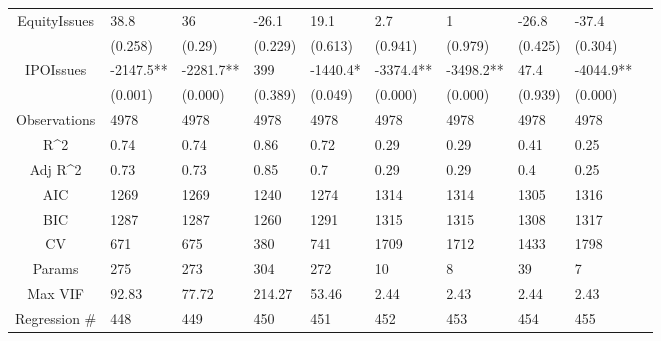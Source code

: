 \documentclass{article}
\begin{document}
\begin{table}[H]
\begin{tabular}{|clllllllll|}
  EquityIssues & 38.8 & 36 & -26.1 & 19.1 & 2.7 & 1 & -26.8 & -37.4 & \\ 
   & (0.258) & (0.29) & (0.229) & (0.613) & (0.941) & (0.979) & (0.425) & (0.304) & \\ 
  IPOIssues & -2147.5** & -2281.7** & 399 & -1440.4* & -3374.4** & -3498.2** & 47.4 & -4044.9** & \\ 
   & (0.001) & (0.000) & (0.389) & (0.049) & (0.000) & (0.000) & (0.939) & (0.000) & \\ 
  \hline 
 Observations & 4978 & 4978 & 4978 & 4978 & 4978 & 4978 & 4978 & 4978 & \\ 
  R^2 & 0.74 & 0.74 & 0.86 & 0.72 & 0.29 & 0.29 & 0.41 & 0.25 & \\ 
  Adj R^2 & 0.73 & 0.73 & 0.85 & 0.7 & 0.29 & 0.29 & 0.4 & 0.25 & \\ 
  AIC & 1269 & 1269 & 1240 & 1274 & 1314 & 1314 & 1305 & 1316 & \\ 
  BIC & 1287 & 1287 & 1260 & 1291 & 1315 & 1315 & 1308 & 1317 & \\ 
  CV & 671 & 675 & 380 & 741 & 1709 & 1712 & 1433 & 1798 & \\ 
  Params & 275 & 273 & 304 & 272 & 10 & 8 & 39 & 7 & \\ 
  Max VIF & 92.83 & 77.72 & 214.27 & 53.46 & 2.44 & 2.43 & 2.44 & 2.43 & \\ 
  Regression \# & 448 & 449 & 450 & 451 & 452 & 453 & 454 & 455 & \\ 
   \hline
\end{tabular}
 
\end{table}
\end{document}
